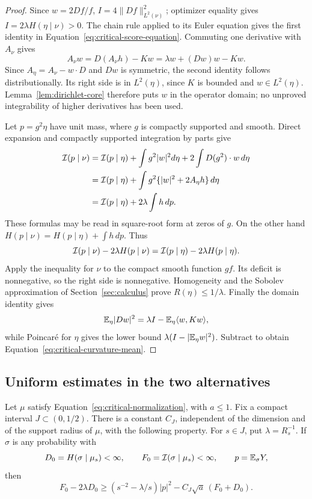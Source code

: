 \begin{proof}
Since $w=2Df/f$, $I=4\|Df\|_{L^2(\nu)}^2$; optimizer
equality gives $I=2\lambda H(\eta\mid\nu)>0$.
The chain rule applied to its Euler equation gives the first
identity in Equation~\eqref{eq:critical-score-equation}. Commuting
one derivative with $A_\nu$ gives
\[
 A_\nu w=D(A_\nu h)-Kw
       =\lambda w+(Dw)w-Kw.
\]
Since $A_\eta=A_\nu-w\cdot D$ and $Dw$ is symmetric, the
second identity follows distributionally. Its right side is in
$L^2(\eta)$, since $K$ is bounded and $w\in L^2(\eta)$.
Lemma~\ref{lem:dirichlet-core} therefore puts $w$ in the
operator domain; no unproved integrability of higher derivatives
has been used.

Let $p=g^2\eta$ have unit mass, where $g$ is compactly supported
and smooth. Direct expansion and compactly supported integration
by parts give
\begin{align*}
 \mathcal I(p\mid\nu)
 &=\mathcal I(p\mid\eta)+\int g^2|w|^2d\eta
                    +2\int D(g^2)\cdot w\,d\eta\\
 &=\mathcal I(p\mid\eta)+\int g^2\{|w|^2+2A_\eta h\}\,d\eta\\
 &=\mathcal I(p\mid\eta)+2\lambda\int h\,dp.
\end{align*}
These formulas may be read in square-root form at zeros of $g$.
On the other hand
$H(p\mid\nu)=H(p\mid\eta)+\int h\,dp$. Thus
\begin{equation}\label{eq:critical-exact-deficit}
 \mathcal I(p\mid\nu)-2\lambda H(p\mid\nu)
 =\mathcal I(p\mid\eta)-2\lambda H(p\mid\eta).
\end{equation}
Apply the inequality for $\nu$ to the compact smooth function
$gf$. Its deficit is nonnegative, so the right side is
nonnegative. Homogeneity and the Sobolev approximation of
Section~\ref{sec:calculus} prove $R(\eta)\le1/\lambda$.
Finally the domain identity gives
\[
 \mathbb E_\eta|Dw|^2=\lambda I-\mathbb E_\eta\langle w,Kw\rangle,
\]
while Poincar\'e for $\eta$ gives the lower bound
$\lambda(I-|\mathbb E_\eta w|^2)$. Subtract to obtain
Equation~\eqref{eq:critical-curvature-mean}.
\end{proof}

\subsection{Uniform estimates in the two alternatives}

\begin{lemma}\label{lem:translation-gain}
Let $\mu$ satisfy Equation~\eqref{eq:critical-normalization}, with
$a\le1$. Fix a compact interval $J\subset(0,1/2)$. There is a
constant $C_J$, independent of the dimension and of the support
radius of $\mu$, with the following property. For $s\in J$, put
$\lambda=R_s^{-1}$. If $\sigma$ is any probability with
\[
 D_0=H(\sigma\mid\mu_s)<\infty,\qquad
 F_0=\mathcal I(\sigma\mid\mu_s)<\infty,\qquad p=\mathbb E_\sigma Y,
\]
then
\begin{equation}\label{eq:critical-translation-gain}
 F_0-2\lambda D_0
 \ge(s^{-2}-\lambda/s)|p|^2
                   -C_J\sqrt a\,(F_0+D_0).
\end{equation}
\end{lemma}

